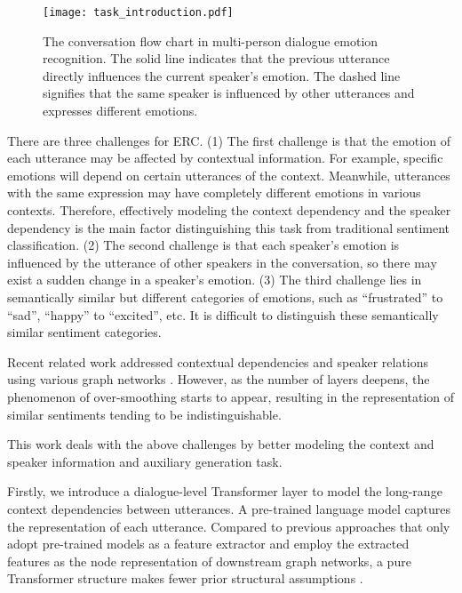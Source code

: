\documentclass[letterpaper]{article} \usepackage{aaai22}  \usepackage{times}  \usepackage{helvet}  \usepackage{courier}  \usepackage[hyphens]{url}  \usepackage{graphicx} \urlstyle{rm} \def\UrlFont{\rm}  \usepackage{natbib}  \usepackage{caption} \DeclareCaptionStyle{ruled}{labelfont=normalfont,labelsep=colon,strut=off} \frenchspacing  \setlength{\pdfpagewidth}{8.5in}  \setlength{\pdfpageheight}{11in}  \usepackage{algorithm}
\begin{document}
\begin{figure}[t]
\centering
\texttt{[image: task\_introduction.pdf]} \caption{The conversation flow chart in multi-person dialogue emotion recognition. The solid line indicates that the previous utterance directly influences the current speaker's emotion. The dashed line signifies that the same speaker is influenced by other utterances and expresses different emotions.}
\label{task_intro}
\end{figure}

There are three challenges for ERC. (1) The first challenge is that the emotion of each utterance may be affected by contextual information. For example, specific emotions will depend on certain utterances of the context. Meanwhile, utterances with the same expression may have completely different emotions in various contexts. Therefore, effectively modeling the context dependency and the speaker dependency is the main factor distinguishing this task from traditional sentiment classification. (2) The second challenge is that each speaker's emotion is influenced by the utterance of other speakers in the conversation, so there may exist a sudden change in a speaker's emotion. (3) The third challenge lies in semantically similar but different categories of emotions, such as ``frustrated'' to ``sad'', ``happy'' to ``excited'', etc. It is difficult to distinguish these semantically similar sentiment categories.

Recent related work addressed contextual dependencies and speaker relations using various graph networks \cite{dag-erc, ghosal-etal-2019-dialoguegcn, rgat, sheng-etal-2020-sumagggin}. However, as the number of layers deepens, the phenomenon of over-smoothing \cite{over-smoothing-aaai-20} starts to appear, resulting in the representation of similar sentiments tending to be indistinguishable.

This work deals with the above challenges by better modeling the context and speaker information and auxiliary generation task.


Firstly, we introduce a dialogue-level Transformer \cite{transformer-nips-2017} layer to model the long-range context dependencies between utterances. A pre-trained language model captures the representation of each utterance. Compared to previous approaches that only adopt pre-trained models as a feature extractor \cite{roberta} and employ the extracted features as the node representation of downstream graph networks, a pure Transformer structure makes fewer prior structural assumptions \cite{transformer_survey}.
\end{document}
